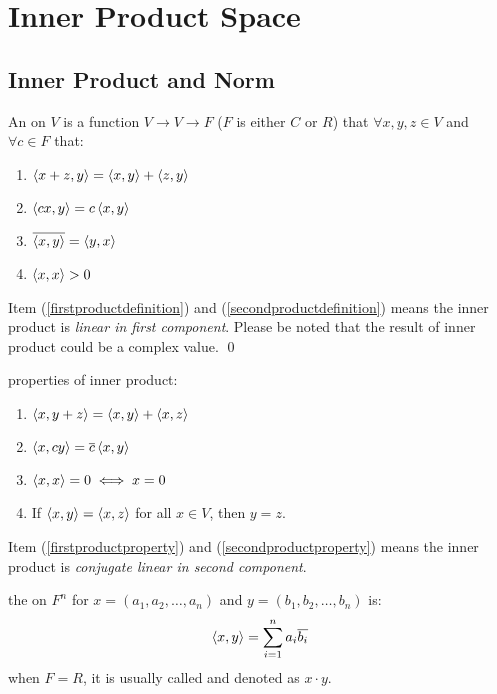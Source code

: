 \section{Inner Product Space}


\subsection{Inner Product and Norm}

\begin{definition}
	An  on $V$ is a function $V \rightarrow V \rightarrow F$ ($F$ is either $C$ or $R$) that $\forall x,y,z \in V$ and $\forall c \in F$ that:
	\begin{enumerate}
		\item $\left\langle \displaystyle x+z, y \right\rangle = \left\langle \displaystyle x, y \right\rangle + \left\langle \displaystyle z, y \right\rangle$ \label{firstproductdefinition}
		\item $\left\langle \displaystyle cx, y \right\rangle = c \left\langle \displaystyle x, y \right\rangle$ \label{secondproductdefinition}
		\item $\overline{\left\langle \displaystyle x, y \right\rangle} = \left\langle \displaystyle y, x \right\rangle$
		\item $\left\langle \displaystyle x, x \right\rangle > 0$
	\end{enumerate}
	Item (\ref{firstproductdefinition}) and (\ref{secondproductdefinition}) means the inner product is \emph{linear in first component}.
	Please be noted that the result of inner product could be a complex value.
	\qed
\end{definition}


\begin{theorem}
	properties of inner product:
	\begin{enumerate}
		\item $\left\langle \displaystyle x, y+z \right\rangle = \left\langle \displaystyle x, y \right\rangle + \left\langle \displaystyle x, z \right\rangle$ \label{firstproductproperty}
		\item $\left\langle \displaystyle x, cy \right\rangle = \overline{c} \left\langle \displaystyle x, y \right\rangle $ \label{secondproductproperty}
		\item $\left\langle \displaystyle x, x \right\rangle = 0 \iff x = 0$
		\item If $\left\langle \displaystyle x, y \right\rangle = \left\langle \displaystyle x, z \right\rangle$ for all $x \in V$, then $y=z$.
	\end{enumerate}
	Item (\ref{firstproductproperty}) and (\ref{secondproductproperty}) means the inner product is \emph{conjugate linear in second component}.
\end{theorem}


\begin{definition}
	the  on $F^n$ for $x=(a_1,a_2,\dots,a_n)$ and $y=(b_1,b_2,\dots,b_n)$ is:
	\begin{equation}
		\left\langle \displaystyle x, y \right\rangle = \sum_{i=1}^n a_i \overline{b_i}		
	\end{equation}
	when $F=R$, it is usually called  and denoted as $x \cdot y$.
\end{definition}

